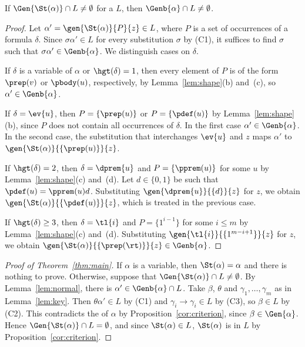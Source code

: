 \begin{lemma}\label{lem:normal}
If $\Gen{\St(\alpha)}\cap L\neq\emptyset$ for a  $L$, then
$\Genb{\alpha}\cap L\neq\emptyset$.
\end{lemma}
\begin{proof}
Let $\alpha'=\gen{\St(\alpha)}{P}{z}\in L$, where $P$ is a set of
occurrences of a formula $\delta$. Since $\sigma\alpha'\in L$ for every
substitution $\sigma$ by (C1), it suffices to find $\sigma$ such that
$\sigma\alpha'\in\Genb{\alpha}$. We distinguish cases on $\delta$.

If $\delta$ is a variable of $\alpha$ or $\hgt(\delta)=1$, then every
element of $P$ is of the form $\prep(v)$ or $\pbody(u)$, respectively, by
Lemma~\ref{lem:shape}(b) and~(c), so $\alpha'\in\Genb{\alpha}$.

If $\delta=\ev{u}$, then $P=\{\prep(u)\}$ or $P=\{\pdef(u)\}$ by
Lemma~\ref{lem:shape}(b), since $P$ does not contain all occurrences of
$\delta$. In the first case $\alpha'\in\Genb{\alpha}$. In the second case,
the substitution that interchanges $\ev{u}$ and $z$ maps $\alpha'$ to
$\gen{\St(\alpha)}{\{\prep(u)\}}{z}$.

If $\hgt(\delta)=2$, then $\delta=\dprem{u}$ and $P=\{\pprem(u)\}$ for
some $u$ by Lemma~\ref{lem:shape}(c) and~(d). Let $d\in\{0,1\}$ be such
that $\pdef(u)=\pprem(u)d$. Substituting $\gen{\dprem{u}}{\{d\}}{z}$ for
$z$, we obtain $\gen{\St(\alpha)}{\{\pdef(u)\}}{z}$, which is treated in
the previous case.

If $\hgt(\delta)\ge3$, then $\delta=\tl{i}$ and $P=\{1^{i-1}\}$ for some
$i\le m$ by Lemma~\ref{lem:shape}(c) and~(d). Substituting
$\gen{\tl{i}}{\{1^{m-i+1}\}}{z}$ for $z$, we obtain
$\gen{\St(\alpha)}{\{\prep(\rt)\}}{z}\in\Genb{\alpha}$.
\end{proof}

\begin{proof}[Proof of Theorem~\ref{thm:main}]
If $\alpha$ is a variable, then $\St(\alpha)=\alpha$ and there is
nothing to prove. Otherwise, suppose
that $\Gen{\St(\alpha)}\cap L\neq\emptyset$.
By Lemma~\ref{lem:normal}, there is $\alpha'\in\Genb{\alpha}\cap L$. Take $\beta$, $\theta$ and $\gamma_1,\dots,\gamma_m$ as in
Lemma~\ref{lem:key}. Then $\theta\alpha'\in L$ by (C1) and
$\gamma_i\to\gamma_i\in L$ by (C3), so $\beta\in L$ by (C2). This
contradicts the  of $\alpha$ by
Proposition~\ref{cor:criterion}, since $\beta\in\Gen{\alpha}$. Hence
$\Gen{\St(\alpha)}\cap L=\emptyset$, and since $\St(\alpha)\in L$,
$\St(\alpha)$ is  in $L$ by Proposition~\ref{cor:criterion}.
\end{proof}

